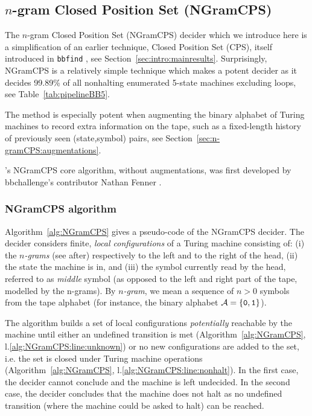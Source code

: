 
\newcommand{\ngramcps}{NGramCPS\xspace}

\subsection{$n$-gram Closed Position Set (\ngramcps)}\label{sec:n-gramCPS}

The $n$-gram Closed Position Set (\ngramcps) decider which we introduce here is a simplification of an earlier technique, Closed Position Set (CPS), itself introduced in \texttt{bbfind} \cite{Skelet_bbfind}, see Section~\ref{sec:intro:mainresults}. Surprisingly, \ngramcps is a relatively simple technique which makes a potent decider as it decides 99.89\% of all nonhalting enumerated 5-state machines excluding loops, see Table~\ref{tab:pipelineBB5}.

The method is especially potent when augmenting the binary alphabet of Turing machines to record extra information on the tape, such as a fixed-length history of previously seen (state,symbol) pairs, see Section~\ref{sec:n-gramCPS:augmentations}.

\CoqBBnospace's \ngramcps core algorithm, without augmentations, was first developed by bbchallenge's contributor Nathan Fenner \cite{ngramcps_fenner}. 

\subsubsection{\ngramcps algorithm}\label{sec:n-gramCPS:algo}

Algorithm~\ref{alg:NGramCPS} gives a pseudo-code of the \ngramcps decider. The decider considers finite, \textit{local configurations} of a Turing machine consisting of: (i) the \textit{$n$-grams} (see after) respectively to the left and to the right of the head, (ii) the state the machine is in, and (iii) the symbol currently read by the head, referred to as \textit{middle} symbol (as opposed to the left and right part of the tape, modelled by the n-grams). By \textit{$n$-gram}, we mean a sequence of $n > 0$ symbols from the tape alphabet (for instance, the binary alphabet $\mathcal{A}=\{\texttt{0},\texttt{1}\}$).

The algorithm builds a set of local configurations \textit{potentially} reachable by the machine until either an undefined transition is met (Algorithm~\ref{alg:NGramCPS}, l.\ref{alg:NGramCPS:line:unknown}) or no new configurations are added to the set, i.e. the set is closed under Turing machine operations (Algorithm~\ref{alg:NGramCPS}, l.\ref{alg:NGramCPS:line:nonhalt}). In the first case, the decider cannot conclude and the machine is left undecided. In the second case, the decider concludes that the machine does not halt as no undefined transition (\ie where the machine could be asked to halt) can be reached.

